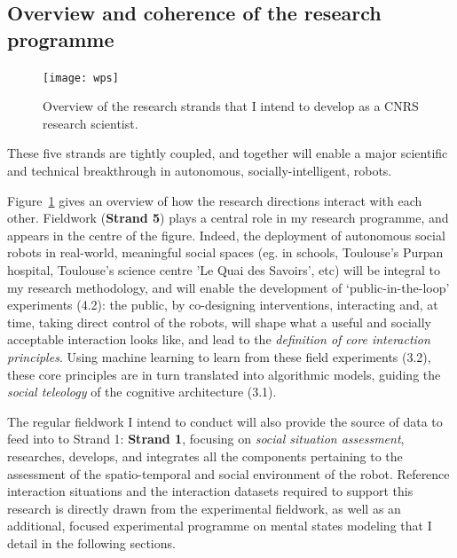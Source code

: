 

\subsection{Overview and coherence of the research programme}

\begin{figure}[h!]
\centering
\texttt{[image: wps]}
\caption{Overview of the research strands that I intend to develop as a CNRS
    research scientist.}
\label{fig:wps}
\end{figure}

These five strands are tightly coupled, and together will enable a major
scientific and technical breakthrough in autonomous, socially-intelligent,
robots.

Figure~\ref{fig:wps} gives an overview of how the research directions interact
with each other. Fieldwork (\textbf{Strand 5}) plays a central role in my research programme, and
appears in the centre of the figure. Indeed, the deployment of autonomous social
robots in real-world, meaningful social spaces (eg. in schools, Toulouse's
Purpan hospital, Toulouse's science centre 'Le Quai des Savoirs', etc) will be
integral to my research methodology, and will enable the development of
`public-in-the-loop' experiments (4.2): the public, by co-designing interventions,
interacting and, at time, taking direct control of the robots, will shape what a
useful and socially acceptable interaction looks like, and lead to the
\emph{definition of core interaction principles}. Using machine learning to learn from
these field experiments (3.2), these core principles are in turn translated into
algorithmic models, guiding the \emph{social teleology} of the cognitive architecture
(3.1).

The regular fieldwork I intend to conduct will also provide the source of data
to feed into to Strand 1: \textbf{Strand 1}, focusing on \emph{social situation
assessment}, researches, develops, and integrates all the components pertaining
to the assessment of the spatio-temporal and social environment of the robot.
Reference interaction situations and the interaction datasets required to
support this research is directly drawn from the experimental fieldwork, as well
as an additional, focused experimental programme on mental states modeling that
I detail in the following sections.

